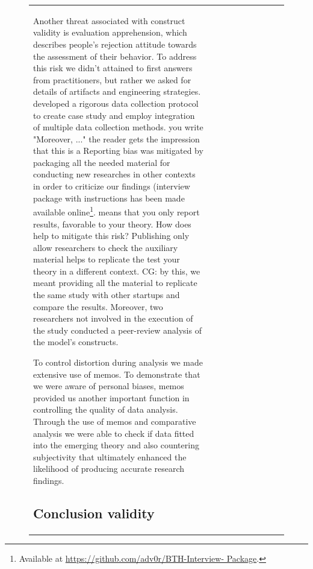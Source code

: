 \documentclass[12pt,journal,compsoc]{../sty/IEEEtran}
\begin{document}
\begin{table}[!t]
\begin{figure}[!t]
\begin{compactitem}
\begin{table}[!t]
\begin{tabular}{|l||c||c||c||c||c||c||c||c||c|}
Another threat associated with construct validity is evaluation  apprehension,
which describes people's rejection attitude towards the  assessment of their
behavior.  To address this risk we didn't attained to first answers from
practitioners, but  rather we asked for details of artifacts and engineering
strategies. %
developed a rigorous data collection protocol to create case study  %
and employ integration of multiple data collection methods.%
you write "Moreover, ..." the reader gets the impression that this is a
Reporting bias was mitigated by packaging all the needed  material for
conducting new researches in other contexts in order to criticize  our findings
(interview package with instructions has been made available
online\footnote{Available at  \url{https://github.com/adv0r/BTH-Interview-
Package}.}. %
means that you only report results,  %
favorable to your theory. How does  %
help to mitigate this risk? Publishing  %
only allow researchers to check the  %
auxiliary material helps to replicate the  %
test your theory in a different context. CG: by this, we meant providing all the
material to replicate the same study with other startups and compare the
results. Moreover, two researchers not involved in the execution of the study
conducted  a peer-review analysis of the model's constructs.

To control distortion during analysis we made extensive use of memos. To
demonstrate that we were aware of personal biases, memos provided us another
important function in controlling the quality of data analysis. Through the use
of memos and comparative analysis we were able to check if data fitted into the
emerging theory and also countering subjectivity that ultimately enhanced the
likelihood of producing accurate research findings.

\subsection{Conclusion validity}


\end{tabular}
\end{table}
\end{compactitem}
\end{figure}
\end{table}
\end{document}

